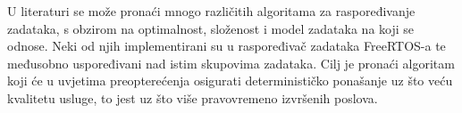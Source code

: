 \documentclass[../zavrsni.tex]{subfiles}
\begin{document}
U literaturi se može pronaći mnogo različitih algoritama za raspoređivanje zadataka, s obzirom na optimalnost, složenost i model zadataka na koji se odnose. 
Neki od njih implementirani su u raspoređivač zadataka FreeRTOS-a 
te međusobno uspoređivani nad istim skupovima zadataka. Cilj je pronaći algoritam koji će u uvjetima preopterećenja osigurati 
determinističko ponašanje uz što veću kvalitetu usluge, to jest uz što više pravovremeno izvršenih poslova.
\end{document}
